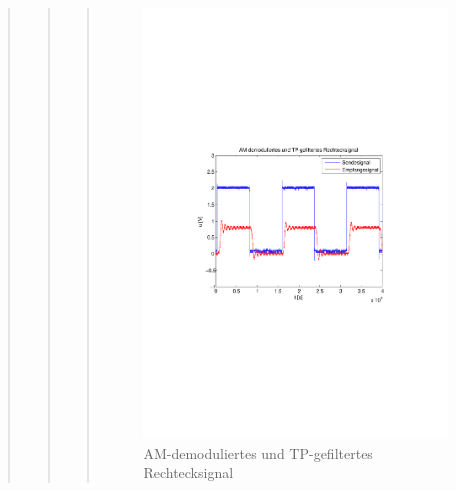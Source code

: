 \begin{quote}
\begin{quote}
\begin{quote}
                 \begin{figure}[H] \centering
                        \includegraphics[scale=0.5, trim = 2cm 6.5cm 1.5cm 8.5cm,
                        clip]{./Bilder/synchDemodFilter_rechteck}
                            \caption{AM-demoduliertes und
                            TP-gefiltertes Rechtecksignal}
                    \end{figure}
                    

\end{quote}
\end{quote}
\end{quote}
